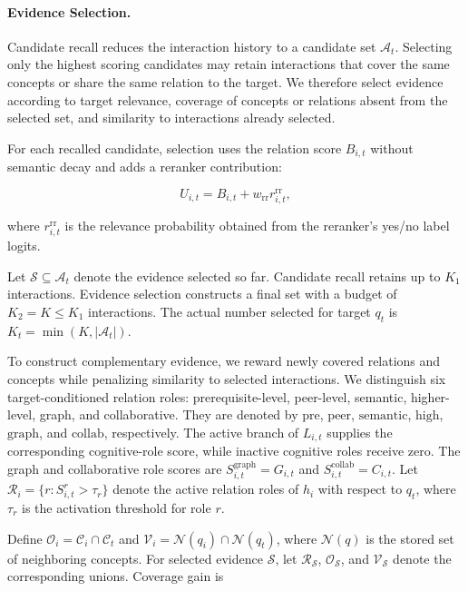 \documentclass{llncs}
\begin{document}
\paragraph{Evidence Selection.}

Candidate recall reduces the interaction history to a candidate set \(\mathcal{A}_t\). Selecting only the highest scoring candidates may retain interactions that cover the same concepts or share the same relation to the target. We therefore select evidence according to target relevance, coverage of concepts or relations absent from the selected set, and similarity to interactions already selected.

For each recalled candidate, selection uses the relation score $B_{i,t}$ without semantic decay and adds a reranker contribution:

\begin{equation}
U_{i,t}=B_{i,t}+w_{\mathrm{rr}}r_{i,t}^{\mathrm{rr}},
\end{equation}

where $r_{i,t}^{\mathrm{rr}}$ is the relevance probability obtained from the reranker's yes/no label logits.

Let $\mathcal S\subseteq\mathcal A_t$ denote the evidence selected so far. Candidate recall retains up to $K_1$ interactions. Evidence selection constructs a final set with a budget of $K_2=K\leq K_1$ interactions. The actual number selected for target $q_t$ is $K_t=\min(K,|\mathcal A_t|)$. 

To construct complementary evidence, we reward newly covered relations and concepts while penalizing similarity to selected interactions. We distinguish six target-conditioned relation roles: prerequisite-level, peer-level, semantic, higher-level, graph, and collaborative. They are denoted by $\mathrm{pre}$, $\mathrm{peer}$, $\mathrm{semantic}$, $\mathrm{high}$, $\mathrm{graph}$, and $\mathrm{collab}$, respectively. The active branch of $L_{i,t}$ supplies the corresponding cognitive-role score, while inactive cognitive roles receive zero. The graph and collaborative role scores are $S_{i,t}^{\mathrm{graph}}=G_{i,t}$ and $S_{i,t}^{\mathrm{collab}}=C_{i,t}$. Let $\mathcal R_i=\{r:S_{i,t}^r>\tau_r\}$ denote the active relation roles of $h_i$ with respect to $q_t$, where $\tau_r$ is the activation threshold for role $r$. 

Define $\mathcal O_i=\mathcal C_i\cap\mathcal C_t$ and $\mathcal V_i=\mathcal N(q_i)\cap\mathcal N(q_t)$, where $\mathcal N(q)$ is the stored set of neighboring concepts. For selected evidence $\mathcal S$, let $\mathcal R_{\mathcal S}$, $\mathcal O_{\mathcal S}$, and $\mathcal V_{\mathcal S}$ denote the corresponding unions. Coverage gain is
\end{document}
